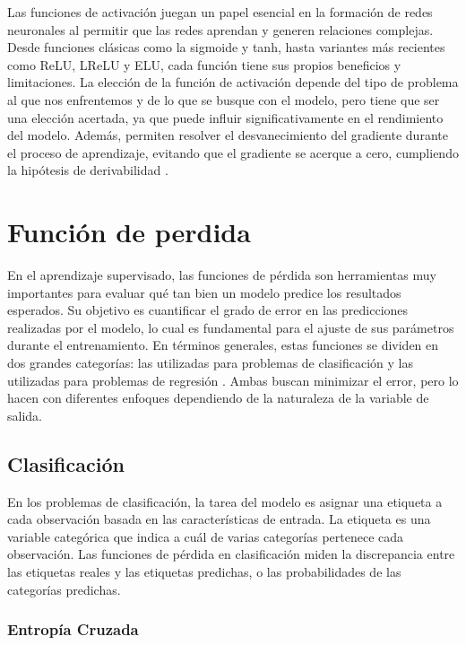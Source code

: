 Las funciones de activación juegan un papel esencial en la formación de redes neuronales al permitir que las redes aprendan y generen relaciones complejas. Desde funciones clásicas como la sigmoide y tanh, hasta variantes más recientes como ReLU, LReLU y ELU, cada función tiene sus propios beneficios y limitaciones. La elección de la función de activación depende del tipo de problema al que nos enfrentemos y de lo que se busque con el modelo, pero tiene que ser una elección acertada, ya que puede influir significativamente en el rendimiento del modelo. Además, permiten resolver el desvanecimiento del gradiente durante el proceso de aprendizaje, evitando que el gradiente se acerque a cero, cumpliendo la hipótesis de derivabilidad \citep{pajares2021aprendizaje}.


\section{Función de perdida}

En el aprendizaje supervisado, las funciones de pérdida son herramientas muy importantes para evaluar qué tan bien un modelo predice los resultados esperados. Su objetivo es cuantificar el grado de error en las predicciones realizadas por el modelo, lo cual es fundamental para el ajuste de sus parámetros durante el entrenamiento. En términos generales, estas funciones se dividen en dos grandes categorías: las utilizadas para problemas de clasificación y las utilizadas para problemas de regresión \citep{pajares2021aprendizaje}. Ambas buscan minimizar el error, pero lo hacen con diferentes enfoques dependiendo de la naturaleza de la variable de salida.

\subsection{Clasificación}

En los problemas de clasificación, la tarea del modelo es asignar una etiqueta a cada observación basada en las características de entrada. La etiqueta es una variable categórica que indica a cuál de varias categorías pertenece cada observación. Las funciones de pérdida en clasificación miden la discrepancia entre las etiquetas reales y las etiquetas predichas, o las probabilidades de las categorías predichas.

\subsubsection{Entropía Cruzada}


